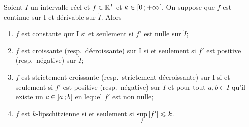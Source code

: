 \begin{theo}
  Soient $I$ un intervalle réel et $f \in \mathbb{R}^I$ et $k \in \left[ 0 \, ;  +\infty \right[$. On suppose que $f$ est continue sur I et dérivable sur $\mathring{I}$. Alors
  \begin{enumerate}
  \item $f$ est constante qur I si et seulement si $f'$ est nulle sur $\mathring{I}$;
  \item $f$ est croissante (resp.\ décroissante) sur I si et seulement si $f'$ est positive (resp.\ négative) sur $\mathring{I}$;
  \item $f$ est strictement croissante (resp.\ strictement décroissante) sur I si et seulement si $f'$ est positive (resp.\ négative) sur $\mathring{I}$ et pour tout $a,b \in I$ qu'il existe un $c \in \left] a \, ;  b \right[$ en lequel $f'$ est non nulle;
  \item $f$ est $k$-lipschitzienne si et seulement si $\sup\limits_{\mathring{I}} \left\lvert f'\right\rvert \leqslant k$.
  \end{enumerate}
\end{theo}
